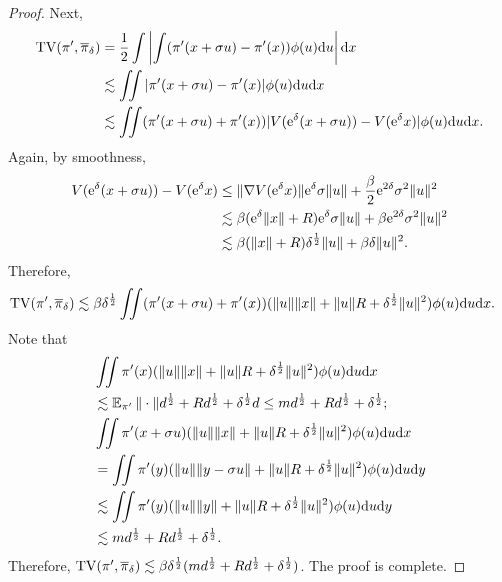 \begin{proof}
Next,
\begin{align*}
    \operatorname{TV}(\pi',\overline{\pi}_\delta)&=\frac{1}{2}\int\left|\int(\pi'(x+\sigma u)-\pi'(x))\phi(u)\mathrm{d} u\right|\mathrm{d} x\\
    &\lesssim\iint|\pi'(x+\sigma u)-\pi'(x)|\phi(u)\mathrm{d} u\mathrm{d} x\\
    &\lesssim\iint(\pi'(x+\sigma u)+\pi'(x))|V(\mathrm{e}^\delta(x+\sigma u))-V(\mathrm{e}^\delta x)|\phi(u)\mathrm{d} u\mathrm{d} x.
\end{align*}
Again, by smoothness,
\begin{align*}
    V(\mathrm{e}^\delta(x+\sigma u))-V(\mathrm{e}^\delta x)&\le\|\nabla V(\mathrm{e}^\delta x)\|\mathrm{e}^\delta\sigma\|u\|+\frac{\beta}{2}\mathrm{e}^{2\delta}\sigma^2\|u\|^2\\
    &\lesssim\beta(\mathrm{e}^\delta\|x\|+R)\mathrm{e}^\delta\sigma\|u\|+\beta\mathrm{e}^{2\delta}\sigma^2\|u\|^2\\
    &\lesssim\beta(\|x\|+R)\delta^{\frac12}\|u\|+\beta\delta\|u\|^2.
\end{align*}
Therefore,
\begin{align*}
    \operatorname{TV}(\pi',\overline{\pi}_\delta)&\lesssim\beta\delta^{\frac12}\iint(\pi'(x+\sigma u)+\pi'(x))(\|u\|\|x\|+\|u\|R+\delta^{\frac12}\|u\|^2)\phi(u)\mathrm{d} u\mathrm{d} x.
\end{align*}
Note that
\begin{align*}
    &\iint\pi'(x)(\|u\|\|x\|+\|u\|R+\delta^{\frac12}\|u\|^2)\phi(u)\mathrm{d} u\mathrm{d} x\\
    &\lesssim\operatorname{\mathbb{E}}_{\pi'}\|\cdot\|d^{\frac12}+Rd^{\frac12}+\delta^{\frac12}d\le md^{\frac12}+Rd^{\frac12}+\delta^{\frac12};\\
    &\iint\pi'(x+\sigma u)(\|u\|\|x\|+\|u\|R+\delta^{\frac12}\|u\|^2)\phi(u)\mathrm{d} u\mathrm{d} x\\
    &=\iint\pi'(y)(\|u\|\|y-\sigma u\|+\|u\|R+\delta^{\frac12}\|u\|^2)\phi(u)\mathrm{d} u\mathrm{d} y\\
    &\lesssim\iint\pi'(y)(\|u\|\|y\|+\|u\|R+\delta^{\frac12}\|u\|^2)\phi(u)\mathrm{d} u\mathrm{d} y\\
    &\lesssim md^{\frac12}+Rd^{\frac12}+\delta^{\frac12}.
\end{align*}
Therefore, $\operatorname{TV}(\pi',\overline{\pi}_\delta)\lesssim\beta\delta^{\frac12}(md^{\frac12}+Rd^{\frac12}+\delta^{\frac12})$. The proof is complete.
\end{proof}